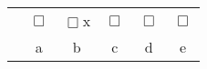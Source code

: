 \begin{center}
\begin{tabular}{c c c c c c}
& $\Box$ & $\Box$\hspace{-0.25cm}x   & $\Box$   & $\Box$   & $\Box$  \\
& a & b  & c  & d  & e \\
\end{tabular}
\end{center}
